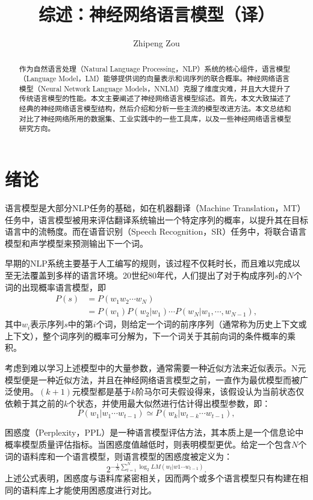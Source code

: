 \documentclass[a4paper, 12pt, twocolumn]{article}
\title{综述：神经网络语言模型（译）}
\author{Zhipeng Zou}
\begin{document}
  \maketitle
  \begin{abstract}
    作为自然语言处理（Natural Language Processing，NLP）系统的核心组件，语言模型（Language Model，LM）能够提供词的向量表示和词序列的联合概率。神经网络语言模型（Neural Network Language Models，NNLM）克服了维度灾难，并且大大提升了传统语言模型的性能。本文主要阐述了神经网络语言模型综述。首先，本文大致描述了经典的神经网络语言模型结构，然后介绍和分析一些主流的模型改进方法。本文总结和对比了神经网络所用的数据集、工业实践中的一些工具库，以及一些神经网络语言模型研究方向。
  \end{abstract}
  \section{绪论}
  语言模型是大部分NLP任务的基础，如在机器翻译（Machine Translation，MT）任务中，语言模型被用来评估翻译系统输出一个特定序列的概率，以提升其在目标语言中的流畅度。而在语音识别（Speech Recognition，SR）任务中，将联合语言模型和声学模型来预测输出下一个词。

  早期的NLP系统主要基于人工编写的规则，该过程不仅耗时长，而且难以完成以至无法覆盖到多样的语言环境。20世纪80年代，人们提出了对于构成序列$s$的$N$个词的出现概率语言模型，即
  \begin{equation}
    \begin{aligned}
      P(s)&=P(w_1w_2\cdots w_N) \\
      &= P(w_1)P(w_2|w_1)\cdots P(w_N|w_1,\cdots,w_{N-1}),
    \end{aligned}
    \label{eq:1}
  \end{equation}
  其中$w_i$表示序列$s$中的第$i$个词，则给定一个词的前序序列（通常称为历史上下文或上下文），整个词序列的概率可分解为，下一个词关于其前向词的条件概率的乘积。

  考虑到难以学习上述模型中的大量参数，通常需要一种近似方法来近似表示。N元模型便是一种近似方法，并且在神经网络语言模型之前，一直作为最优模型而被广泛使用。$(k+1)$元模型都是基于$k$阶马尔可夫假设得来，该假设认为当前状态仅依赖于其之前的$k$个状态，并使用最大似然进行估计得出模型参数，即：
  \begin{equation}
    P(w_1|w_1\cdots w_{t-1}) \simeq P(w_k|w_{t-k}\cdots w_{t-1}),
    \label{eq:2}
  \end{equation}

  困惑度（Perplexity，PPL）\cite{jelinek1977perplexity}是一种语言模型评估方法，其本质上是一个信息论中概率模型质量评估指标。当困惑度值越低时，则表明模型更优。给定一个包含$N$个词的语料库和一个语言模型，则语言模型的困惑度被定义为：
  \begin{equation}
    2^{-\frac{1}{N}\sum_{t=1}^{N}\log_2 LM(w_t|w1\cdots w_{t-1})}.
    \label{eq:3}
  \end{equation}
  上述公式表明，困惑度与语料库紧密相关，因而两个或多个语言模型只有构建在相同的语料库上才能使用困惑度进行对比。
\end{document}
